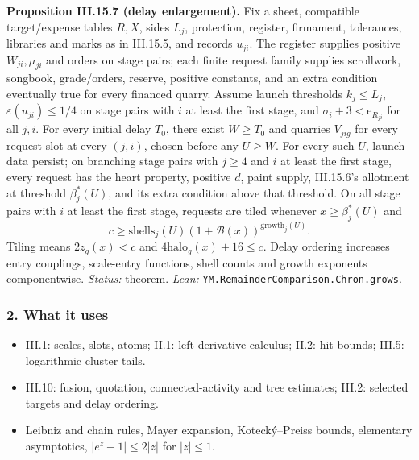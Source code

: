 \documentclass[
  letterpaper,
  11pt]{article}
\providecommand{\tightlist}{%
  \setlength{\itemsep}{0pt}\setlength{\parskip}{0pt}}
\begin{document}
\textbf{Proposition III.15.7 (delay enlargement).} Fix a sheet,
compatible target/expense tables \(R,X\), sides \(L_j\), protection,
register, firmament, tolerances, libraries and marks as in III.15.5, and
records \(u_{ji}\). The register supplies positive \(W_{ji},\mu_{ji}\)
and orders on stage pairs; each finite request family supplies
scrollwork, songbook, grade/orders, reserve, positive constants, and an
extra condition eventually true for every financed quarry. Assume launch
thresholds \(k_j\le L_j\), \(\varepsilon(u_{ji})\le1/4\) on stage pairs
with \(i\) at least the first stage, and
\(\sigma_i+3<\mathrm e_{R_{ji}}\) for all \(j,i\). For every initial
delay \(T_0\), there exist \(W\ge T_0\) and quarries \(V_{jig}\) for
every request slot at every \((j,i)\), chosen before any \(U\ge W\). For
every such \(U\), launch data persist; on branching stage pairs with
\(j\ge4\) and \(i\) at least the first stage, every request has the
heart property, positive \(d\), paint supply, III.15.6's allotment at
threshold \(\beta_j^*(U)\), and its extra condition above that
threshold. On all stage pairs with \(i\) at least the first stage,
requests are tiled whenever \(x\ge\beta_j^*(U)\) and
\[c\ge\mathrm{shells}_j(U)(1+\mathcal B(x))^{\mathrm{growth}_j(U)}.\]
Tiling means \(2z_g(x)<c\) and \(4\mathrm{halo}_g(x)+16\le c\). Delay
ordering increases entry couplings, scale-entry functions, shell counts
and growth exponents componentwise. \emph{Status:} theorem. \emph{Lean:}
\href{https://github.com/yang-mills-group/OpenAI-YM-20261028/blob/3456e5e75cf8d4cd558955a5c7638fba2d68f464/YM/RemainderComparison/Chron/Corners.lean\#L33-L70}{\texttt{YM.RemainderComparison.Chron.grows}}.

\subsubsection{2. What it uses}\label{what-it-uses-17}

\begin{itemize}
\tightlist
\item
  III.1: scales, slots, atoms; II.1: left-derivative calculus; II.2: hit
  bounds; III.5: logarithmic cluster tails.
\item
  III.10: fusion, quotation, connected-activity and tree estimates;
  III.2: selected targets and delay ordering.
\item
  Leibniz and chain rules, Mayer expansion, Kotecký--Preiss bounds,
  elementary asymptotics, \(|e^z-1|\le2|z|\) for \(|z|\le1\).
\end{itemize}
\end{document}
